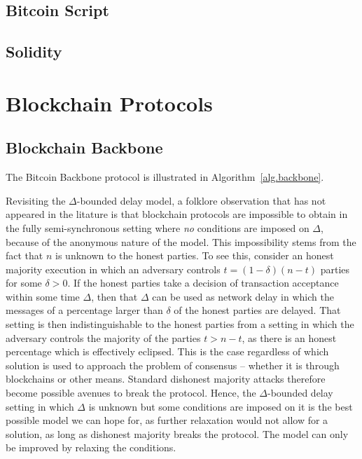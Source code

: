 \subsection{Bitcoin Script}
\subsection{Solidity}


\section{Blockchain Protocols}


\subsection{Blockchain Backbone}

\cite{backbone,pass-asynchronous,varbackbone}

The Bitcoin Backbone protocol is illustrated in Algorithm~\ref{alg.backbone}.



\begin{remark}
Revisiting the $\Delta$-bounded delay model, a folklore observation that has not appeared in
the litature is that blockchain protocols are impossible to obtain in the fully
semi-synchronous setting where \emph{no} conditions are imposed on $\Delta$,
because of the anonymous nature of the model. This impossibility stems from the
fact that $n$ is unknown to the honest parties. To see this, consider an
honest majority execution in which an adversary controls $t = (1 - \delta)(n -
t)$ parties for some $\delta > 0$. If the honest parties take a decision of
transaction acceptance within some time $\Delta$, then that $\Delta$ can be used
as network delay in which the messages of a percentage larger than $\delta$ of
the honest parties are delayed. That setting is then indistinguishable to the
honest parties from a setting in which the adversary controls the majority of
the parties $t > n - t$, as there is an honest percentage which is effectively
eclipsed. This is the case regardless of which solution is used to approach the
problem of consensus -- whether it is through blockchains or other means.
Standard dishonest majority attacks therefore become possible avenues to break
the protocol. Hence, the $\Delta$-bounded delay setting in which $\Delta$ is
unknown but some conditions are imposed on it is the best possible model we can
hope for, as further relaxation would not allow for a solution, as long as
dishonest majority breaks the protocol. The model can only be improved by
relaxing the conditions.
\end{remark}

